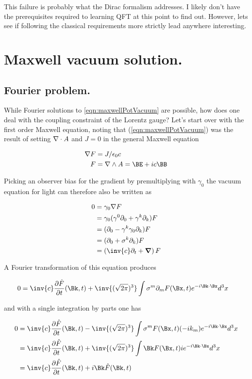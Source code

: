 \documentclass[]{eliblog}
\begin{document}
This failure is probably what the Dirac formalism addresses.  I likely don't have the prerequisites required to learning QFT at this point to find out.  However, lets see if following the classical requirements more strictly lead anywhere interesting.

\section{Maxwell vacuum solution.}

\subsection{Fourier problem.}
While Fourier solutions to \ref{eqn:maxwellPotVacuum} are possible, how does one deal with the coupling constraint of the Lorentz gauge?  Let's start
over with the first order Maxwell equation, noting that (\ref{eqn:maxwellPotVacuum}) was the result of setting $\nabla \cdot A$ and $J = 0$ in the
general Maxwell equation

\begin{align}\label{eqn:maxwell}
\grad F &= J/\epsilon_0 c \\
F &= \grad \wedge A = \BE + i c \BB
\end{align}

Picking an observer bias for the gradient by premultiplying with $\gamma_0$ the vacuum equation for light can therefore also be written as

\begin{align*}
0
&= \gamma_0 \grad F \\
&= \gamma_0 (\gamma^0 \partial_0 + \gamma^k \partial_k) F \\
&= (\partial_0 - \gamma^k \gamma_0 \partial_k) F \\
&= (\partial_0 + \sigma^k \partial_k) F \\
&= \left(\inv{c}\partial_t + \spacegrad \right) F \\
\end{align*}

A Fourier transformation of this equation produces

\begin{align*}
0 &= \inv{c} \PD{t}{\hat{F}}(\Bk,t) + \inv{(\sqrt{2\pi})^3} \int \sigma^m \partial_m F(\Bx,t) e^{-i \Bk \cdot \Bx} d^3 x
\end{align*}

and with a single integration by parts one has

\begin{align*}
0
&= \inv{c} \PD{t}{\hat{F}}(\Bk,t) - \inv{(\sqrt{2\pi})^3} \int \sigma^m F(\Bx,t) (-i k_m) e^{-i \Bk \cdot \Bx} d^3 x \\
&= \inv{c} \PD{t}{\hat{F}}(\Bk,t) + \inv{(\sqrt{2\pi})^3} \int \Bk F(\Bx,t) i e^{-i \Bk \cdot \Bx} d^3 x \\
&= \inv{c} \PD{t}{\hat{F}}(\Bk,t) + i \Bk \hat{F}(\Bk,t)
\end{align*}
\end{document}
